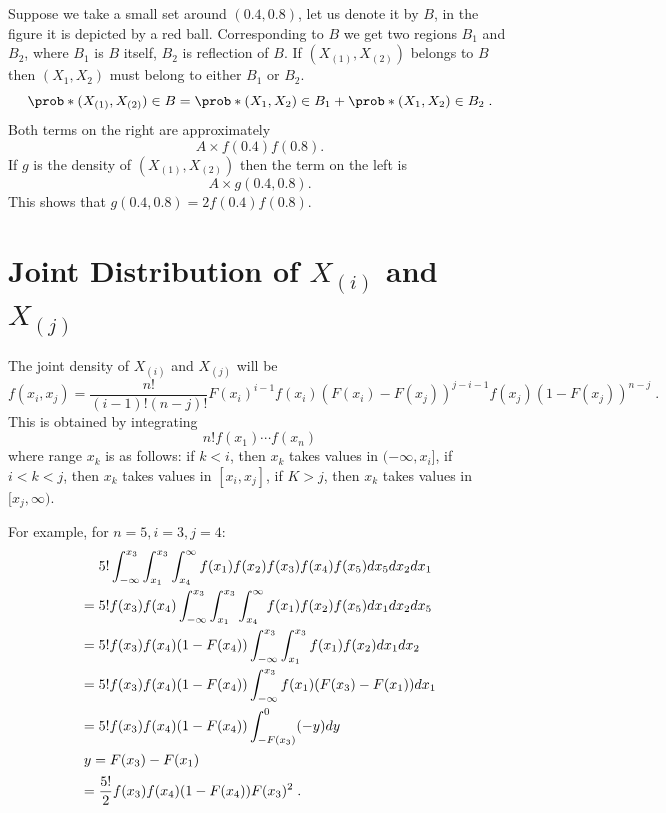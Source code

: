 \noindent Suppose we take a small set around $(0.4,0.8)$, let us denote it by $B$, in the figure it is depicted by a red ball. Corresponding to $B$ we get two regions $B_1$ and $B_2$, where $B_1$ is $B$ itself, $B_2$ is reflection of $B$. If $(X_{(1)},X_{(2)})$ belongs to $B$ then $(X_1,X_2)$ must belong to either $B_1$ or $B_2$.
\[
\prob*{(X_{(1)},X_{(2)})\in B} = 
\prob*{(X_{1},X_{2})\in B_1} + 
\prob*{(X_{1},X_{2})\in B_2} \;. 
\]
Both terms on the right are approximately
\[
A \times f(0.4)f(0.8).
\]
If $g$ is the density of $(X_{(1)},X_{(2)})$ then the term on the left is 
\[
A \times g(0.4,0.8).
\]
This shows that $g(0.4,0.8)=2 f(0.4)f(0.8)$.

\section{Joint Distribution of $X_{(i)}$ and $X_{(j)}$}

The joint density of $X_{(i)}$ and $X_{(j)}$ will be
\[
f(x_i,x_j) = \frac{n!}{(i-1)!(n-j)!} F(x_i)^{i-1} f(x_i) (F(x_i)-F(x_j))^{j-i-1} f(x_j) (1-F(x_j))^{n-j}\;.
\]
This is obtained by integrating 
\[
n!f(x_1)\cdots f(x_n)
\]
where range $x_k$ is as follows: 
if $k<i$, then $x_k$ takes values in $(-\infty,x_i]$,
if $i<k<j$, then $x_k$ takes values in $[x_i,x_j]$,
if $K>j$, then $x_k$ takes values in $[x_j,\infty)$.

For example, for $n=5,i=3,j=4$:
\begin{align*}
& 5! \int_{-\infty}^{x_3}\int_{x_1}^{x_3}\int_{x_4}^{\infty} f(x_1)f(x_2)f(x_3)f(x_4)f(x_5) dx_5dx_2dx_1  \\ 
={} & 5! f(x_3)f(x_4)\int_{-\infty}^{x_3}\int_{x_1}^{x_3}\int_{x_4}^{\infty} f(x_1)f(x_2)f(x_5) dx_1dx_2dx_5  \\
={} & 5! f(x_3)f(x_4)(1-F(x_4))\int_{-\infty}^{x_3}\int_{x_1}^{x_3} f(x_1)f(x_2) dx_1dx_2  \\
={} & 5! f(x_3)f(x_4)(1-F(x_4))\int_{-\infty}^{x_3} f(x_1)(F(x_3)-F(x_1)) dx_1  \\
={} & 5! f(x_3)f(x_4)(1-F(x_4))\int_{-F(x_3)}^{0}(-y)dy\\
\intertext{\hfill $y=F(x_3)-F(x_1)$}
={} & \frac{5!}{2} f(x_3)f(x_4)(1-F(x_4))F(x_3)^2\;.
\end{align*}

\newpage

